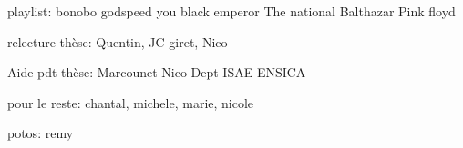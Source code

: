 
playlist:
bonobo
godspeed you black emperor
The national
Balthazar
Pink floyd

relecture thèse:
Quentin,
JC giret,
Nico

Aide pdt thèse:
Marcounet
Nico
Dept ISAE-ENSICA

pour le reste:
chantal, michele, marie, nicole

potos:
remy